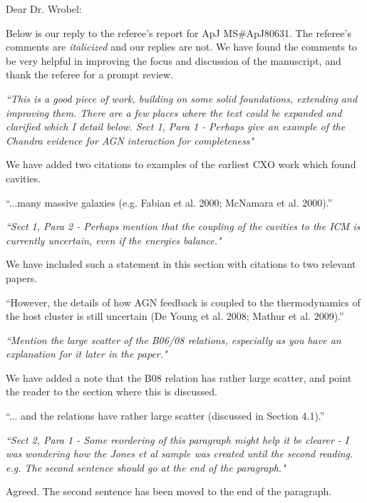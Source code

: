 \documentclass[11pt]{article}
\begin{document}
Dear Dr. Wrobel:

Below is our reply to the referee's report for ApJ MS\#ApJ80631. The
referee's comments are {\it{italicized}} and our replies are not. We
have found the comments to be very helpful in improving the focus and
discussion of the manuscript, and thank the referee for a prompt
review.

\hrulefill

{\it{``This is a good piece of work, building on some solid
    foundations, extending and improving them. There are a few places
    where the text could be expanded and clarified which I detail
    below. Sect 1, Para 1 - Perhaps give an example of the Chandra
    evidence for AGN interaction for completeness"}}

We have added two citations to examples of the earliest CXO work which
found cavities.

``...many massive galaxies (e.g. Fabian et al. 2000; McNamara et al.
2000).''

\hrulefill

{\it{``Sect 1, Para 2 - Perhaps mention that the coupling of the
    cavities to the ICM is currently uncertain, even if the energies
    balance."}}

We have included such a statement in this section with citations to
two relevant papers.

``However, the details of how AGN feedback is coupled to the
thermodynamics of the host cluster is still uncertain (De Young et
al. 2008; Mathur et al. 2009).''

\hrulefill

{\it{``Mention the large scatter of the B06/08 relations, especially as
    you have an explanation for it later in the paper."}}

We have added a note that the B08 relation has rather large scatter,
and point the reader to the section where this is discussed.

``... and the relations have rather large scatter (discussed in
Section 4.1).''

\hrulefill

{\it{``Sect 2, Para 1 - Some reordering of this paragraph might help it
    be clearer - I was wondering how the Jones et al sample was
    created until the second reading.  e.g. The second sentence should
    go at the end of the paragraph."}}

Agreed. The second sentence has been moved to the end of the
paragraph.

\hrulefill
\end{document}
